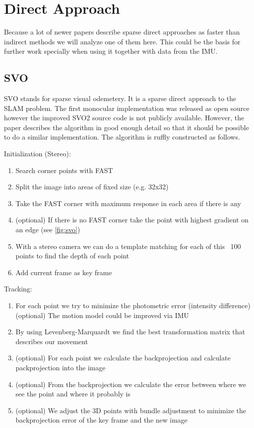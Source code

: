 \documentclass[11pt,a4paper,titlepage,oneside]{report}
\begin{document}
\chapter{Direct Approach}

Because a lot of newer papers describe sparse direct approaches as faster than indirect methods we will analyze one of them here. This could be the basis for further work specially when using it together with data from the IMU.

\section{SVO}

SVO stands for sparse visual odemetery. It is a sparse direct approach to the SLAM problem. The first monocular implementation was released as open source however the improved SVO2 source code is not publicly available. However, the paper describes the algorithm in good enough detail so that it should be possible to do a similar implementation. The algorithm is ruffly constructed as follows.

Initialization (Stereo):
\begin{enumerate}
	\item Search corner points with FAST
	\item Split the image into areas of fixed size (e.g. 32x32)
	\item Take the FAST corner with maximum response in each area if there is any
	\item (optional) If there is no FAST corner take the point with highest gradient on an edge (see \ref{fig:svo})
	\item With a stereo camera we can do a template matching for each of this ~100 points to find the depth of each point
	\item Add current frame as key frame
\end{enumerate}

Tracking:
\begin{enumerate}
	\item For each point we try to minimize the photometric error (intensity difference)
		\subitem (optional) The motion model could be improved via IMU
	\item By using Levenberg-Marquardt we find the best transformation matrix that describes our movement
	\item (optional) For each point we calculate the backprojection and calculate packprojection into the image
	\item (optional) From the backprojection we calculate the error between where we see the point and where it probably is
	\item (optional) We adjust the 3D points with bundle adjustment to minimize the backprojection error of the key frame and the new image
\end{enumerate}
\end{document}
